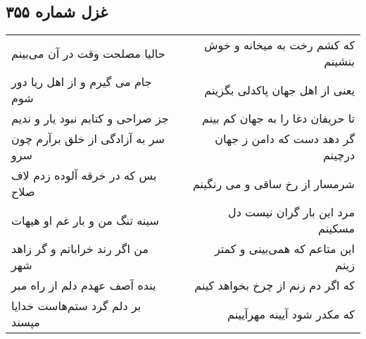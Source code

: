 \begin{center}
\section*{غزل شماره ۳۵۵}
\label{sec:sh355}
\begin{longtable}{l p{0.5cm} r}
حالیا مصلحت وقت در آن می‌بینم
&&
که کشم رخت به میخانه و خوش بنشینم
\\
جام می گیرم و از اهل ریا دور شوم
&&
یعنی از اهل جهان پاکدلی بگزینم
\\
جز صراحی و کتابم نبود یار و ندیم
&&
تا حریفان دغا را به جهان کم بینم
\\
سر به آزادگی از خلق برآرم چون سرو
&&
گر دهد دست که دامن ز جهان درچینم
\\
بس که در خرقه آلوده زدم لاف صلاح
&&
شرمسار از رخ ساقی و می رنگینم
\\
سینه تنگ من و بار غم او هیهات
&&
مرد این بار گران نیست دل مسکینم
\\
من اگر رند خراباتم و گر زاهد شهر
&&
این متاعم که همی‌بینی و کمتر زینم
\\
بنده آصف عهدم دلم از راه مبر
&&
که اگر دم زنم از چرخ بخواهد کینم
\\
بر دلم گرد ستم‌هاست خدایا مپسند
&&
که مکدر شود آیینه مهرآیینم
\\
\end{longtable}
\end{center}

